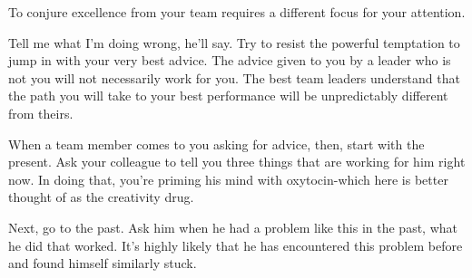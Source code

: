 \documentclass[ebook,12pt,oneside,openany]{memoir}
\begin{document}
To conjure excellence from your team requires a different focus for your attention.

Tell me what I'm doing wrong, he'll say. Try to resist the powerful temptation to jump in 
with your very best advice. The advice given to you by a leader who is not you will not necessarily work for you.
The best team leaders understand that the path you will take to your best performance will be unpredictably different 
from theirs. 

When a team member comes to you asking for advice, then, start with the present.
Ask your colleague to tell you three things that are working for him right now.
In doing that, you're priming his mind with oxytocin-which here is better thought of as the creativity drug.

Next, go to the past. Ask him when he had a problem like this in the past, what he did that worked.
It's highly likely that he has encountered this problem before and found himself similarly stuck.
\end{document}
